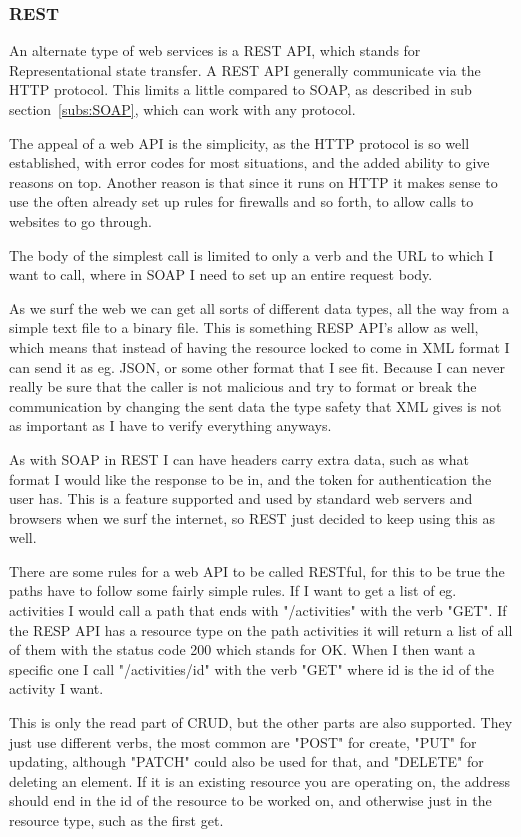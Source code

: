 \subsubsection{REST}
\label{subs:REST}
An alternate type of web services is a REST API, which stands for
Representational state transfer. A REST API generally communicate via the HTTP
protocol. This limits a little compared to SOAP, as described in sub
section~\ref{subs:SOAP}, which can work with any protocol. 

The appeal of a web API is the simplicity, as the HTTP protocol is so well
established, with error codes for most situations, and the added ability to give
reasons on top. Another reason is that since it runs on HTTP it makes sense to
use the often already set up rules for firewalls and so forth, to allow calls to
websites to go through. 

The body of the simplest call is limited to only a verb and the URL to which I
want to call, where in SOAP I need to set up an entire request body. 

As we surf the web we can get all sorts of different data types, all the way
from a simple text file to a binary file. This is something RESP API's allow as
well, which means that instead of having the resource locked to come in XML
format I can send it as eg. JSON, or some other format that I see
fit\cite{rest:basic}. Because I can never really be sure that the caller is not
malicious and try to format or break the communication by changing the sent data
the type safety that XML gives is not as important as I have to verify
everything anyways. 

As with SOAP in REST I can have headers carry extra data, such as what format I
would like the response to be in, and the token for authentication the user has.
This is a feature supported and used by standard web servers and browsers when
we surf the internet, so REST just decided to keep using this as well. 

There are some rules for a web API to be called RESTful\cite{rest:msdn}, for
this to be true the paths have to follow some fairly simple rules. If I want to
get a list of eg. activities I would call a path that ends with "/activities"
with the verb "GET". If the RESP API has a resource type on the path activities
it will return a list of all of them with the status code 200 which stands for
OK. When I then want a specific one I call "/activities/id" with the verb "GET"
where id is the id of the activity I want. 

This is only the read part of CRUD, but the other parts are also supported. They
just use different verbs, the most common are "POST" for create, "PUT" for
updating, although "PATCH" could also be used for that, and "DELETE" for
deleting an element. If it is an existing resource you are operating on, the
address should end in the id of the resource to be worked on, and otherwise just
in the resource type, such as the first get. 

